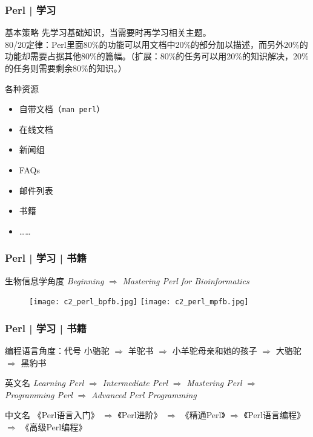\begin{frame}[fragile]
  \frametitle{Perl | 学习}
  \begin{block}{基本策略}
    先学习基础知识，当需要时再学习相关主题。\\
    80/20定律：Perl里面80\%的功能可以用文档中20\%的部分加以描述，而另外20\%的功能却需要占据其他80\%的篇幅。（扩展：80\%的任务可以用20\%的知识解决，20\%的任务则需要剩余80\%的知识。）
  \end{block}
  \pause
  \begin{block}{各种资源}
    \begin{itemize}
      \item 自带文档（\verb|man perl|）
      \item 在线文档
      \item 新闻组
      \item FAQs
      \item 邮件列表
      \item 书籍
      \item ……
    \end{itemize}
  \end{block}
\end{frame}

\begin{frame}
  \frametitle{Perl | 学习 | 书籍}
  \begin{block}{生物信息学角度}
    \textit{Beginning} $\Longrightarrow$ \textit{Mastering Perl for Bioinformatics}
  \end{block}
  \begin{figure}
    \centering
    \texttt{[image: c2\_perl\_bpfb.jpg]}
    \hspace{1em}
    \texttt{[image: c2\_perl\_mpfb.jpg]}
  \end{figure}
\end{frame}

\begin{frame}
  \frametitle{Perl | 学习 | 书籍}
  \begin{block}{编程语言角度：代号}
小骆驼 $\Rightarrow$ 羊驼书 $\Rightarrow$ 小羊驼母亲和她的孩子 $\Rightarrow$ 大骆驼 $\Rightarrow$ 黑豹书
  \end{block}
  \pause
  \begin{block}{英文名}
    \textit{Learning Perl} $\Rightarrow$ \textit{Intermediate Perl} $\Rightarrow$ \textit{Mastering Perl} $\Rightarrow$ \textit{Programming Perl} $\Rightarrow$ \textit{Advanced Perl Programming}
  \end{block}
  \pause
  \begin{block}{中文名}
    《Perl语言入门》 $\Rightarrow$ 《Perl进阶》 $\Rightarrow$ 《精通Perl》 $\Rightarrow$ 《Perl语言编程》 $\Rightarrow$ 《高级Perl编程》
  \end{block}
  \pause
\end{frame}

